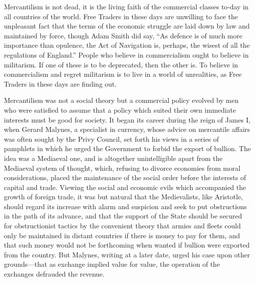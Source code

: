 \documentclass{book}
\begin{document}
Mercantilism is not dead, it is the living faith of the commercial classes to-day in all countries of the world. Free Traders in these days are unwilling to face the unpleasant fact that the terms of the economic struggle are laid down by law and maintained by force, though Adam Smith did say, “As defence is of much more importance than opulence, the Act of Navigation is, perhaps, the wisest of all the regulations of England.” People who believe in commercialism ought to believe in militarism. If one of these is to be deprecated, then the other is. To believe in commercialism and regret militarism is to live in a world of unrealities, as Free Traders in these days are finding out.

Mercantilism was not a social theory but a commercial policy evolved by men who were satisfied to assume that a policy which suited their own immediate interests must be good for society. It began its career during the reign of James I, when Gerard Malynes, a specialist in currency, whose advice on mercantile affairs was often sought by the Privy Council, set forth his views in a series of pamphlets in which he urged the Government to forbid the export of bullion. The idea was a Mediaeval one, and is altogether unintelligible apart from the Mediaeval system of thought, which, refusing to divorce economies from moral considerations, placed the maintenance of the social order before the interests of capital and trade. Viewing the social and economic evils which accompanied the growth of foreign trade, it was but natural that the Medievalists, like Aristotle, should regard its increase with alarm and suspicion and seek to put obstructions in the path of its advance, and that the support of the State should be secured for obstructionist tactics by the convenient theory that armies and fleets could only be maintained in distant countries if there is money to pay for them, and that such money would not be forthcoming when wanted if bullion were exported from the country. But Malynes, writing at a later date, urged his case upon other grounds—that as exchange implied value for value, the operation of the exchanges defrauded the revenue.
\end{document}
